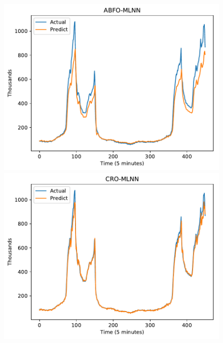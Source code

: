 \documentclass[11pt,twoside]{article}
\begin{document}
\begin{multicols}{2}
\begin{figure}[!ht]
\begin{minipage}[b]{0.33\linewidth}
  \end{minipage} 
  
  \begin{minipage}[b]{0.33\linewidth}
    \centering
    \includegraphics[width=0.9\linewidth]{predict/k5/wc_k5_abfo_mlnn.pdf} 
  \end{minipage}
  \begin{minipage}[b]{0.33\linewidth}
    \centering
    \includegraphics[width=0.9\linewidth]{predict/k5/wc_k5_cro_mlnn.pdf} 
  \end{minipage} 
  \begin{minipage}[b]{0.33\linewidth}
    \centering

\end{minipage}
\end{figure}
\end{multicols}
\end{document}
